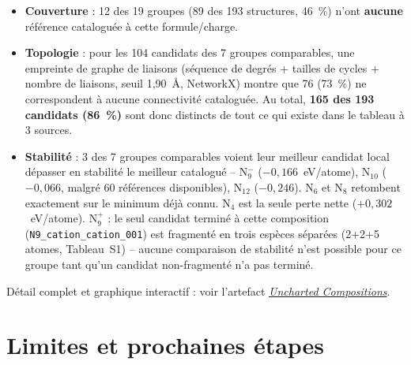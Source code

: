 \documentclass[11pt,a4paper]{article}
\begin{document}
\begin{itemize}[leftmargin=1.4em]
  \item \textbf{Couverture} : 12 des 19 groupes (89 des 193 structures,
  46~\%) n'ont \textbf{aucune} r\'ef\'erence catalogu\'ee \`a cette
  formule/charge.
  \item \textbf{Topologie} : pour les 104 candidats des 7 groupes
  comparables, une empreinte de graphe de liaisons (s\'equence de degr\'es
  + tailles de cycles + nombre de liaisons, seuil 1,90~\AA, NetworkX)
  montre que 76 (73~\%) ne correspondent \`a aucune connectivit\'e
  catalogu\'ee. Au total, \textbf{165 des 193 candidats (86~\%)} sont donc
  distincts de tout ce qui existe dans le tableau \`a 3 sources.
  \item \textbf{Stabilit\'e} : 3 des 7 groupes comparables voient leur
  meilleur candidat local d\'epasser en stabilit\'e le meilleur catalogu\'e
  -- N$_9^-$ ($-0{,}166$~eV/atome), N$_{10}$ ($-0{,}066$, malgr\'e 60
  r\'ef\'erences disponibles), N$_{12}$ ($-0{,}246$). N$_6$ et N$_8$
  retombent exactement sur le minimum d\'ej\`a connu. N$_4$ est la seule
  perte nette ($+0{,}302$~eV/atome).
  N$_9^+$ : le seul candidat termin\'e \`a cette composition
  (\texttt{N9\_cation\_cation\_001}) est fragment\'e en trois esp\`eces
  s\'epar\'ees (2+2+5 atomes, Tableau~S1) -- aucune comparaison de
  stabilit\'e n'est possible pour ce groupe tant qu'un candidat
  non-fragment\'e n'a pas termin\'e.
\end{itemize}

D\'etail complet et graphique interactif : voir l'artefact
\href{https://claude.ai/code/artifact/da2b875a-5560-4a2d-b719-5dbb4d27ddac}{\emph{Uncharted Compositions}}.

\section{Limites et prochaines \'etapes}
\label{sec:limites}
\end{document}
